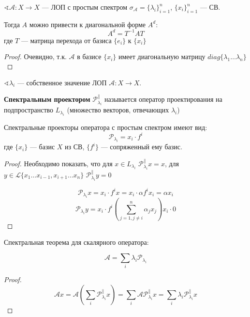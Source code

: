 \begin{theorem}
    $\sphericalangle \mathcal A : X \to X$ --- ЛОП с простым спектром $\sigma_{\mathcal A} = \{\lambda_i\}_{i=1}^n$, $\{x_i\}_{i=1}^n$ --- СВ.
    
    Тогда $A$ можно привести к диагональной форме $A^d$:
    $$A^d = T^{-1} A T$$
    где $T$ --- матрица перехода от базиса $\{e_i\}$ к $\{x_i\}$
\end{theorem}
\begin{proof}
    Очевидно, т.к. $\mathcal A$ в базисе $\{x_i\}$ имеет диагональную матрицу $diag\{\lambda_1 \ldots \lambda_n\}$
\end{proof}

\begin{definition}
    $\sphericalangle \lambda_i$ --- собственное значение ЛОП $\mathcal A : X\to X$.

    \textbf{Спектральным проектором} $\mathcal P_{\lambda_i}^{\parallel}$ называется оператор проектирования на подпространство $L_{\lambda_i}$ (множество векторов, отвечающих $\lambda_i$)
\end{definition}

\begin{lemma}
    Спектральные проекторы оператора с простым спектром имеют вид:
    $$\mathcal P_{\lambda_i} = x_i \cdot f^i$$
    где $\{x_i\}$ --- базис $X$ из СВ, $\{f^i\}$ --- сопряженный ему базис.
\end{lemma}
\begin{proof}
    Необходимо показать, что для $x\in L_{\lambda_i}$ $\mathcal P_{\lambda_i}^{\parallel} x=x$, для $y\in \mathcal L\{x_1\ldots x_{i-1}, x_{i+1}\ldots x_n\}$ $\mathcal P_{\lambda_i}^{\parallel} y=0$

    $$\mathcal P_{\lambda_i} x = x_i \cdot f^i x = x_i \cdot \alpha f^i x_i = \alpha x_i$$
    $$\mathcal P_{\lambda_i} y = x_i \cdot f^i \left(\sum_{j=1, j\not=i}^n \alpha_jx_j \right) x_i \cdot 0$$
\end{proof}

\begin{theorem}
    Спектральная теорема для скалярного оператора:

    $$\mathcal A = \sum_i \lambda_i \mathcal P_{\lambda_i}$$
\end{theorem}
\begin{proof}
    $$\mathcal A x = \mathcal A\left( \sum_i \mathcal P_{\lambda_i}^{\parallel} x \right) = \sum_i \mathcal A \mathcal P_{\lambda_i}^{\parallel} x = \sum_i \lambda_i \mathcal P_{\lambda_i}^{\parallel} x$$
\end{proof}

